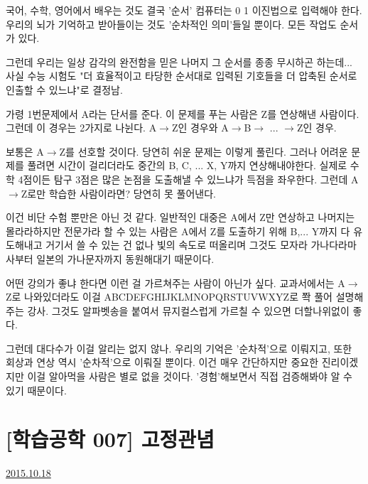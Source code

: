 국어, 수학, 영어에서 배우는 것도 결국 '순서'
컴퓨터는 0 1 이진법으로 입력해야 한다. 우리의 뇌가 기억하고 받아들이는 것도 '순차적인 의미'들일 뿐이다.
모든 작업도 순서가 있다.
\vspace{5mm}

그런데 우리는 일상 감각의 완전함을 믿은 나머지 그 순서를 종종 무시하곤 하는데...
사실 수능 시험도 "더 효율적이고 타당한 순서대로 입력된 기호들을 더 압축된 순서로 인출할 수 있느냐"로 결정남.
\vspace{5mm}

가령 1번문제에서 A라는 단서를 준다.
이 문제를 푸는 사람은 Z를 연상해낸 사람이다.
그런데 이 경우는 2가지로 나뉜다. A$\rightarrow$Z인 경우와 A$\rightarrow$B$\rightarrow$ ... $\rightarrow$Z인 경우.
\vspace{5mm}

보통은 A$\rightarrow$Z를 선호할 것이다. 당연히 쉬운 문제는 이렇게 풀린다.
그러나 어려운 문제를 풀려면 시간이 걸리더라도 중간의 B, C, ... X, Y까지 연상해내야한다.
실제로 수학 4점이든 탐구 3점은 많은 논점을 도출해낼 수 있느냐가 득점을 좌우한다.
그런데 A$\rightarrow$Z로만 학습한 사람이라면? 당연히 못 풀어낸다.
\vspace{5mm}

이건 비단 수험 뿐만은 아닌 것 같다.
일반적인 대중은 A에서 Z만 연상하고 나머지는 몰라라하지만
전문가라 할 수 있는 사람은 A에서 Z를 도출하기 위해 B,... Y까지 다 유도해내고 거기서 쓸 수 있는 건 없나 빛의 속도로 떠올리며
그것도 모자라 가나다라마사부터 일본의 가나문자까지 동원해대기 때문이다.
\vspace{5mm}

어떤 강의가 좋냐 한다면 이런 걸 가르쳐주는 사람이 아닌가 싶다.
교과서에서는 A$\rightarrow$Z로 나와있더라도 이걸 ABCDEFGHIJKLMNOPQRSTUVWXYZ로 쫙 풀어 설명해주는 강사.
그것도 알파벳송을 붙여서 뮤지컬스럽게 가르칠 수 있으면 더할나위없이 좋다.
\vspace{5mm}

그런데 대다수가 이걸 알리는 없지 않나.
우리의 기억은 '순차적'으로 이뤄지고, 또한 회상과 연상 역시 '순차적'으로 이뤄질 뿐이다.
이건 매우 간단하지만 중요한 진리이겠지만 이걸 알아먹을 사람은 별로 없을 것이다. '경험'해보면서 직접 검증해봐야 알 수 있기 때문이다.
\vspace{5mm}






\section{[학습공학 007] 고정관념}
\href{https://www.kockoc.com/Apoc/427079}{2015.10.18}

